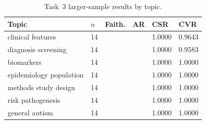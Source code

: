 \begin{table}
\centering
\small
\caption{Task~3 larger-sample results by topic.}
\label{tab:task3-topic-robustness}
\setlength{\tabcolsep}{2pt}
\renewcommand{\arraystretch}{1.08}
\begin{tabular}{P{2.8cm} Q{0.7cm} Q{2.2cm} Q{2.2cm} Q{1.0cm} Q{1.0cm}}
\toprule
\textbf{Topic} & \textbf{$n$} & \textbf{Faith.} & \textbf{AR} & \textbf{CSR} & \textbf{CVR} \\
\midrule
clinical features & 14 &  &  & 1.0000 & 0.9643 \\
diagnosis screening & 14 &  &  & 1.0000 & 0.9583 \\
biomarkers & 14 &  &  & 1.0000 & 1.0000 \\
epidemiology population & 14 &  &  & 1.0000 & 1.0000 \\
methods study design & 14 &  &  & 1.0000 & 1.0000 \\
risk pathogenesis & 14 &  &  & 1.0000 & 1.0000 \\
general autism & 14 &  &  & 1.0000 & 1.0000 \\
\bottomrule
\end{tabular}
\end{table}
